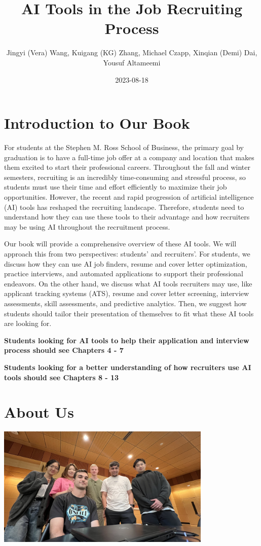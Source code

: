 \documentclass[
]{book}
\title{AI Tools in the Job Recruiting Process}
\author{Jingyi (Vera) Wang, Kuigang (KG) Zhang, Michael Czapp, Xinqian (Demi) Dai, Yousuf Altameemi}
\date{2023-08-18}
\begin{document}
\maketitle

{
\setcounter{tocdepth}{1}
\tableofcontents
}
\hypertarget{introduction-to-our-book}{%
\chapter{Introduction to Our Book}\label{introduction-to-our-book}}

For students at the Stephen M. Ross School of Business, the primary goal by graduation is to have a full-time job offer at a company and location that makes them excited to start their professional careers. Throughout the fall and winter semesters, recruiting is an incredibly time-consuming and stressful process, so students must use their time and effort efficiently to maximize their job opportunities. However, the recent and rapid progression of artificial intelligence (AI) tools has reshaped the recruiting landscape. Therefore, students need to understand how they can use these tools to their advantage and how recruiters may be using AI throughout the recruitment process.

Our book will provide a comprehensive overview of these AI tools. We will approach this from two perspectives: students' and recruiters'. For students, we discuss how they can use AI job finders, resume and cover letter optimization, practice interviews, and automated applications to support their professional endeavors. On the other hand, we discuss what AI tools recruiters may use, like applicant tracking systems (ATS), resume and cover letter screening, interview assessments, skill assessments, and predictive analytics. Then, we suggest how students should tailor their presentation of themselves to fit what these AI tools are looking for.

\textbf{Students looking for AI tools to help their application and interview process should see Chapters 4 - 7}

\textbf{Students looking for a better understanding of how recruiters use AI tools should see Chapters 8 - 13}

\hypertarget{about-us}{%
\chapter{About Us}\label{about-us}}

\includegraphics[width=4.04167in,height=\textheight]{Team Photo.jpg}
\end{document}
